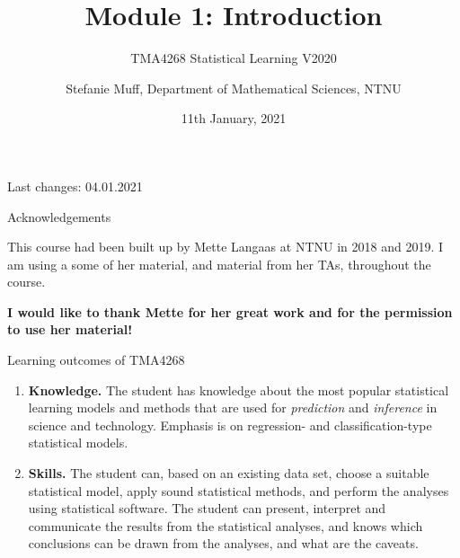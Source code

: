 \documentclass[10pt,ignorenonframetext,]{beamer}
\title{Module 1: Introduction}
\subtitle{TMA4268 Statistical Learning V2020}
\author{Stefanie Muff, Department of Mathematical Sciences, NTNU}
\date{11th January, 2021}
\begin{document}
\frame{\titlepage}

\begin{frame}

Last changes: 04.01.2021

\end{frame}

\begin{frame}{Acknowledgements}
\protect\hypertarget{acknowledgements}{}

This course had been built up by Mette Langaas at NTNU in 2018 and 2019.
I am using a some of her material, and material from her TAs, throughout
the course.

\textbf{I would like to thank Mette for her great work and for the
permission to use her material!}

\end{frame}

\begin{frame}{Learning outcomes of TMA4268}
\protect\hypertarget{learning-outcomes-of-tma4268}{}

\begin{enumerate}
\item
  \textbf{Knowledge.} The student has knowledge about the most popular
  statistical learning models and methods that are used for
  \emph{prediction} and \emph{inference} in science and technology.
  Emphasis is on regression- and classification-type statistical models.
\item
  \textbf{Skills.} The student can, based on an existing data set,
  choose a suitable statistical model, apply sound statistical methods,
  and perform the analyses using statistical software. The student can
  present, interpret and communicate the results from the statistical
  analyses, and knows which conclusions can be drawn from the analyses,
  and what are the caveats.
\end{enumerate}

\end{frame}
\end{document}
